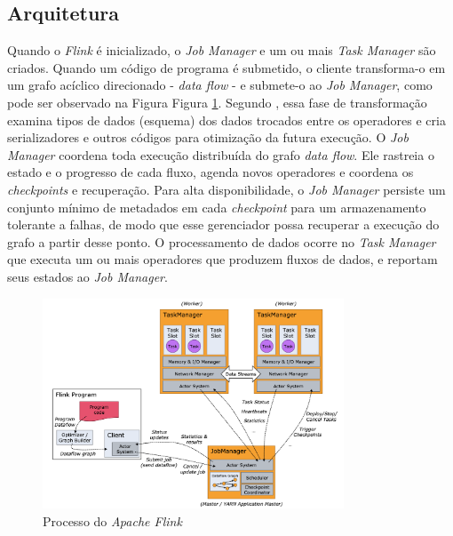 \subsection{Arquitetura}
Quando o \emph{Flink} é inicializado, o \emph{Job Manager} e um ou mais \emph{Task Manager} são criados. Quando um código de programa é submetido, o cliente transforma-o em um grafo acíclico direcionado - \emph{data flow} - e submete-o ao \emph{Job Manager}, como pode ser observado na Figura Figura \ref{processo-flink}. Segundo , essa fase de transformação examina tipos de dados (esquema) dos dados trocados entre os operadores e cria serializadores e outros códigos para otimização da futura execução. O \emph{Job Manager} coordena toda execução distribuída do grafo \emph{data flow}. Ele rastreia o estado e o progresso de cada fluxo, agenda novos operadores e coordena os \emph{checkpoints} e recuperação. Para alta disponibilidade, o \emph{Job Manager} persiste um conjunto mínimo de metadados em cada \emph{checkpoint} para um armazenamento tolerante a falhas, de modo que esse gerenciador possa recuperar a execução do grafo a partir desse ponto. O processamento de dados ocorre no \emph{Task Manager} que executa um ou mais operadores que produzem fluxos de dados, e reportam seus estados ao \emph{Job Manager}. 

\begin{figure}[ht]
\centering
\includegraphics[width=0.8\textwidth]{figuras/processo-flink.png}
\caption{Processo do \emph{Apache Flink} \cite{ApacheFlink2020}}
\label{processo-flink}
\end{figure}

